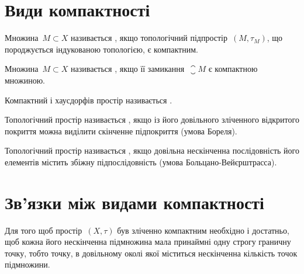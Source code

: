 \section{Види компактності}

\begin{definition}
    Множина~$M \subset X$ називається , якщо топологічний підпростір~$(M, \tau_M)$, що породжується індукованою топологією, є компактним.
\end{definition}

\begin{definition}
    Множина~$M \subset X$ називається , якщо її замикання~$\closure M$ є компактною множиною.
\end{definition}

\begin{definition}
    Компактний і хаусдорфів простір називається .
\end{definition}

\begin{definition}
    Топологічний простір називається , якщо із його довільного зліченного відкритого покриття можна виділити скінченне підпокриття (умова Бореля).
\end{definition}

\begin{definition}
    Топологічний простір називається , якщо довільна нескінченна послідовність його елементів містить збіжну підпослідовність (умова Больцано-Вейєрштрасса).
\end{definition}

\section{Зв'язки між видами компактності}

\begin{theorem}
    Для того щоб простір~$(X, \tau)$ був зліченно компактним необхідно і достатньо, щоб кожна його нескінченна підмножина мала принаймні одну строгу граничну точку, тобто точку, в довільному околі якої міститься нескінченна кількість точок підмножини.
\end{theorem}

